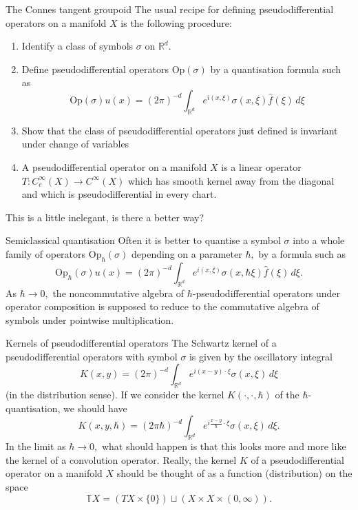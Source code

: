 \documentclass{beamer}
\numberwithin{equation}{section}
\theoremstyle{plain}
\theoremstyle{plain}
\theoremstyle{definition}
\theoremstyle{plain}
\theoremstyle{plain}
\theoremstyle{definition}
\newcommand{\Rl}{\mathbb{R}}
\newcommand{\Op}{\mathrm{Op}}
\begin{document}
\begin{frame}{The Connes tangent groupoid}
  The usual recipe for defining pseudodifferential operators on a manifold $X$ is the following procedure:
  \begin{enumerate}
      \item{} Identify a class of symbols $\sigma$ on $\Rl^d.$
      \item{} Define pseudodifferential operators $\Op(\sigma)$ by a quantisation formula such as
      \[
        \Op(\sigma)u(x) = (2\pi)^{-d} \int_{\Rl^d} e^{i(x,\xi)} \sigma(x,\xi)\widehat{f}(\xi)\,d\xi
      \]
      \item{} Show that the class of pseudodifferential operators just defined is invariant under change of variables
      \item{} A pseudodifferential operator on a manifold $X$ is a linear operator $T:C^\infty_c(X)\to C^\infty(X)$ which has smooth kernel away from the diagonal and which is pseudodifferential in every chart.
  \end{enumerate}
  This is a little inelegant, is there a better way?
\end{frame}

\begin{frame}{Semiclassical quantisation}
  Often it is better to quantise a symbol $\sigma$ into a whole family of operators $\Op_{\hbar}(\sigma)$ depending on a parameter $\hbar,$ by a formula such as
  \[
    \Op_{\hbar}(\sigma)u(x) = (2\pi)^{-d} \int_{\Rl^d} e^{i(x,\xi)}\sigma(x,\hbar \xi)\widehat{f}(\xi)\,d\xi.
  \]
  As $\hbar\to 0,$ the noncommutative algebra of $\hbar$-pseudodifferential operators under operator composition is supposed to reduce to the commutative algebra of symbols under pointwise multiplication.
\end{frame}

\begin{frame}{Kernels of pseudodifferential operators}
  The Schwartz kernel of a pseudodifferential operators with symbol $\sigma$ is given by the oscillatory integral
  \[
      K(x,y) = (2\pi)^{-d}\int_{\Rl^d} e^{i(x-y)\cdot \xi}\sigma(x,\xi)\,d\xi
  \]
  (in the distribution sense). If we consider the kernel $K(\cdot,\cdot,\hbar)$ of the $\hbar$-quantisation, we should have
  \[
      K(x,y,\hbar) = (2\pi \hbar)^{-d} \int_{\Rl^d} e^{i\frac{x-y}{\hbar}\cdot \xi}\sigma(x,\xi)\,d\xi.
  \]
  In the limit as $\hbar\to 0,$ what should happen is that this looks more and more like the kernel of a convolution operator.
  Really, the kernel $K$ of a pseudodifferential operator on a manifold $X$ should be thought of as a function (distribution) on the space
  \[
      \mathbb{T}X = (TX\times \{0\})\sqcup (X\times X\times (0,\infty)).
  \]
\end{frame}
\end{document}
